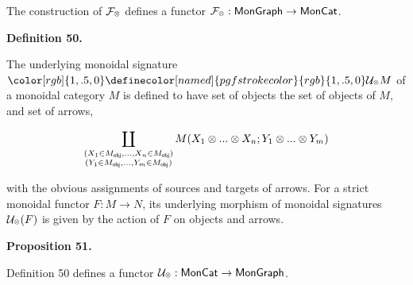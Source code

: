  
The construction of $\mathcal{F}_{\mathbin{\raisebox{1.25pt}{$\scriptscriptstyle\otimes$}}}$ defines a functor $\mathcal{F}_{\mathbin{\raisebox{1.25pt}{$\scriptscriptstyle\otimes$}}}:\mathsf{MonGraph}\to\mathsf{MonCat}$.\par
 
 
 
 
\par\medskip\noindent\textbf{Definition 50.}\par
 
 
The underlying monoidal signature ${\color[rgb]{1,.5,0}\definecolor[named]{pgfstrokecolor}{rgb}{1,.5,0}\mathcal{U}_{\mathbin{\raisebox{1.25pt}{$\scriptscriptstyle\otimes$}}}}M$ of a monoidal category $M$ is defined to have set of objects the set of objects of $M$, and set of arrows,\par
    \[\coprod_{\begin{subarray}{c}(X_{1}\in M_{\mathsf{obj}},...,X_{n}\in M_{\mathsf{obj}})\\
(Y_{1}\in M_{\mathsf{obj}},...,Y_{m}\in M_{\mathsf{obj}})\end{subarray}}M(X_{1}\otimes...\otimes X_{n};Y_{1}\otimes...\otimes Y_{m})\]    
 
 
with the obvious assignments of sources and targets of arrows. For a strict monoidal functor $F:M\to N$, its underlying morphism of monoidal signatures $\mathcal{U}_{\mathbin{\raisebox{1.25pt}{$\scriptscriptstyle\otimes$}}}(F)$ is given by the action of $F$ on objects and arrows.\par
 
 
 
 
\par\medskip\noindent\textbf{Proposition 51.}\par
 
 
Definition 50 defines a functor $\mathcal{U}_{\mathbin{\raisebox{1.25pt}{$\scriptscriptstyle\otimes$}}}:\mathsf{MonCat}\to\mathsf{MonGraph}$.\par
 
